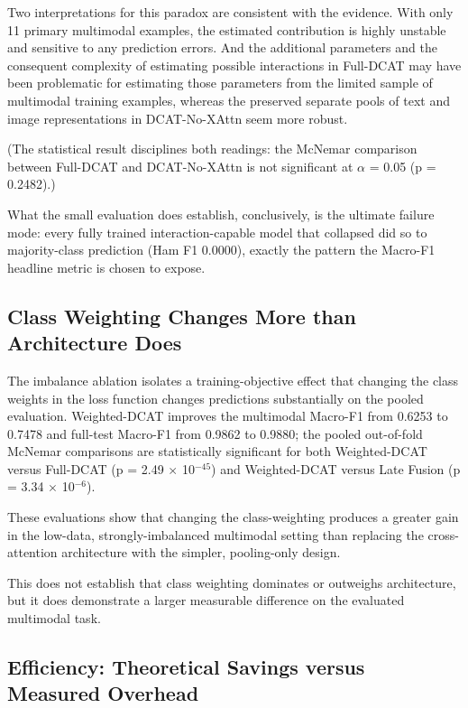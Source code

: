 \documentclass[10pt,twoside]{article}
\begin{document}
Two interpretations for this paradox are consistent with the evidence. With only 11 primary multimodal examples, the estimated contribution is highly unstable and sensitive to any prediction errors. And the additional parameters and the consequent complexity of estimating possible interactions in Full-DCAT may have been problematic for estimating those parameters from the limited sample of multimodal training examples, whereas the preserved separate pools of text and image representations in DCAT-No-XAttn seem more robust.

(The statistical result disciplines both readings: the McNemar comparison between Full-DCAT and DCAT-No-XAttn is not significant at $\alpha$ = 0.05 (p = 0.2482).)

What the small evaluation does establish, conclusively, is the ultimate failure mode: every fully trained interaction-capable model that collapsed did so to majority-class prediction (Ham F1 0.0000), exactly the pattern the Macro-F1 headline metric is chosen to expose.

\subsection{Class Weighting Changes More than Architecture Does}\label{sec:8.3}

The imbalance ablation isolates a training-objective effect that changing the class weights in the loss function changes predictions substantially on the pooled evaluation. Weighted-DCAT improves the multimodal Macro-F1 from 0.6253 to 0.7478 and full-test Macro-F1 from 0.9862 to 0.9880; the pooled out-of-fold McNemar comparisons are statistically significant for both Weighted-DCAT versus Full-DCAT (p = 2.49 $\times$ 10$^{-45}$) and Weighted-DCAT versus Late Fusion (p = 3.34 $\times$ 10$^{-6}$).

These evaluations show that changing the class-weighting produces a greater gain in the low-data, strongly-imbalanced multimodal setting than replacing the cross-attention architecture with the simpler, pooling-only design.

This does not establish that class weighting dominates or outweighs architecture, but it does demonstrate a larger measurable difference on the evaluated multimodal task.

\subsection{Efficiency: Theoretical Savings versus Measured Overhead}\label{sec:8.4}
\end{document}
